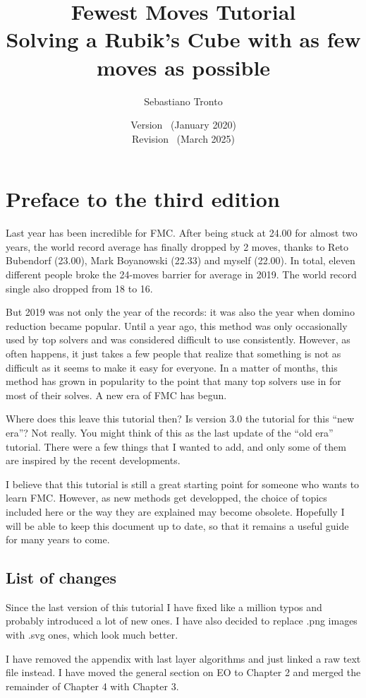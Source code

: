 \documentclass[11pt,a4paper]{book}
\date{Version \majorversion\ (January 2020)\\Revision \version\ (March 2025)}
\author{Sebastiano Tronto}
\title{Fewest Moves Tutorial\\
\large Solving a Rubik's Cube with as few moves as possible}
\begin{document}
\maketitle

\section*{Preface to the third edition}

Last year has been incredible for FMC. After being stuck at 24.00 for almost two years, the world record average has finally dropped by 2 moves, thanks to Reto Bubendorf (23.00), Mark Boyanowski (22.33) and myself (22.00). In total, eleven different people broke the 24-moves barrier for average in 2019. The world record single also dropped from 18 to 16.

But 2019 was not only the year of the records: it was also the year when domino reduction became popular. Until a year ago, this method was only occasionally used by top solvers and was considered difficult to use consistently. However, as often happens, it just takes a few people that realize that something is not as difficult as it seems to make it easy for everyone. In a matter of months, this method has grown in popularity to the point that many top solvers use in for most of their solves. A new era of FMC has begun.

Where does this leave this tutorial then? Is version 3.0 the tutorial for this ``new era''? Not really. You might think of this as the last update of the ``old era'' tutorial. There were a few things that I wanted to add, and only some of them are inspired by the recent developments.

I believe that this tutorial is still a great starting point for someone who wants to learn FMC. However, as new methods get developped, the choice of topics included here or the way they are explained may become obsolete. Hopefully I will be able to keep this document up to date, so that it remains a useful guide for many years to come.

\subsection*{List of changes}

Since the last version of this tutorial I have fixed like a million typos and probably introduced a lot of new ones. I have also decided to replace .png images with .svg ones, which look much better.

I have removed the appendix with last layer algorithms and just linked a raw text file instead. I have moved the general section on EO to Chapter 2 and merged the remainder of Chapter 4 with Chapter 3.
\end{document}
